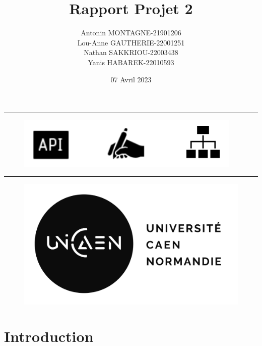 \documentclass[french,12pt]{article}
\title{Rapport Projet 2}
\date{07 Avril 2023}
\begin{document}
\maketitle
\rule{\linewidth}{.5pt}

\begin{figure}[h]
	\begin{center}
		\includegraphics[scale=0.8]{img/fond.png}	
	\end{center}
\end{figure}
\rule{\linewidth}{.5pt}
\begin{center}
\author{Antonin MONTAGNE-21901206\\ Lou-Anne GAUTHERIE-22001251\\ Nathan SAKKRIOU-22003438 \\
    Yanis HABAREK-22010593}
\end{center}

\begin{figure}[b]
	\begin{center}
		\includegraphics[scale=0.7]{img/unicaen.png}	
	\end{center}
\end{figure}

\thispagestyle{empty}
\setcounter{page}{0}
\newpage

\tableofcontents
\newpage

\section{Introduction}
\end{document}
